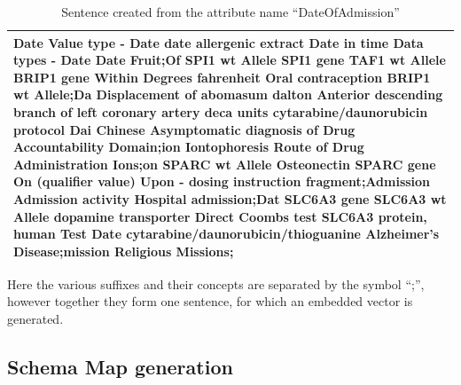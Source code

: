 \documentclass{ieeeaccess}
\begin{document}
\begin{table}[]
	\centering
	\caption{Sentence created from the attribute name ``DateOfAdmission''}
	\label{tab:sentence_example}
	\begin{tabular}{|p{\linewidth}|}
		\hline
		Date Value type - Date date allergenic extract Date in time Data types - Date Date Fruit;Of SPI1 wt Allele SPI1 gene TAF1 wt Allele BRIP1 gene Within Degrees fahrenheit Oral contraception BRIP1 wt Allele;Da Displacement of abomasum dalton Anterior descending branch of left coronary artery deca units cytarabine/daunorubicin protocol Dai Chinese Asymptomatic diagnosis of Drug Accountability Domain;ion Iontophoresis Route of Drug Administration Ions;on SPARC wt Allele Osteonectin SPARC gene On (qualifier value) Upon - dosing instruction fragment;Admission Admission activity Hospital admission;Dat SLC6A3 gene SLC6A3 wt Allele dopamine transporter Direct Coombs test SLC6A3 protein, human Test Date cytarabine/daunorubicin/thioguanine Alzheimer's Disease;mission Religious Missions;\\
		\hline
	\end{tabular}
\end{table}

Here the various suffixes and their concepts are separated by the symbol ``;'', however together they form one sentence, for which an embedded vector is generated. 

\subsection{Schema Map generation}
\label{schema_map_gen}
\end{document}
